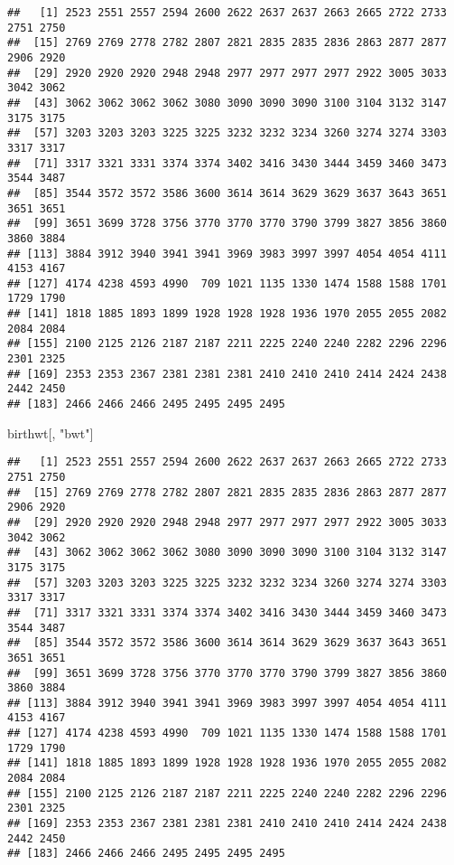 \documentclass[]{book}
\newenvironment{Shaded}{\begin{snugshade}}{\end{snugshade}}
\newcommand{\NormalTok}[1]{#1}
\newcommand{\OperatorTok}[1]{\textcolor[rgb]{0.81,0.36,0.00}{\textbf{#1}}}
\newcommand{\StringTok}[1]{\textcolor[rgb]{0.31,0.60,0.02}{#1}}
\begin{document}
\begin{Shaded}
\end{Shaded}

\begin{verbatim}
##   [1] 2523 2551 2557 2594 2600 2622 2637 2637 2663 2665 2722 2733 2751 2750
##  [15] 2769 2769 2778 2782 2807 2821 2835 2835 2836 2863 2877 2877 2906 2920
##  [29] 2920 2920 2920 2948 2948 2977 2977 2977 2977 2922 3005 3033 3042 3062
##  [43] 3062 3062 3062 3062 3080 3090 3090 3090 3100 3104 3132 3147 3175 3175
##  [57] 3203 3203 3203 3225 3225 3232 3232 3234 3260 3274 3274 3303 3317 3317
##  [71] 3317 3321 3331 3374 3374 3402 3416 3430 3444 3459 3460 3473 3544 3487
##  [85] 3544 3572 3572 3586 3600 3614 3614 3629 3629 3637 3643 3651 3651 3651
##  [99] 3651 3699 3728 3756 3770 3770 3770 3790 3799 3827 3856 3860 3860 3884
## [113] 3884 3912 3940 3941 3941 3969 3983 3997 3997 4054 4054 4111 4153 4167
## [127] 4174 4238 4593 4990  709 1021 1135 1330 1474 1588 1588 1701 1729 1790
## [141] 1818 1885 1893 1899 1928 1928 1928 1936 1970 2055 2055 2082 2084 2084
## [155] 2100 2125 2126 2187 2187 2211 2225 2240 2240 2282 2296 2296 2301 2325
## [169] 2353 2353 2367 2381 2381 2381 2410 2410 2410 2414 2424 2438 2442 2450
## [183] 2466 2466 2466 2495 2495 2495 2495
\end{verbatim}

\begin{Shaded}
\begin{Highlighting}[]
\NormalTok{birthwt[, }\StringTok{"bwt"}\NormalTok{]}
\end{Highlighting}
\end{Shaded}

\begin{verbatim}
##   [1] 2523 2551 2557 2594 2600 2622 2637 2637 2663 2665 2722 2733 2751 2750
##  [15] 2769 2769 2778 2782 2807 2821 2835 2835 2836 2863 2877 2877 2906 2920
##  [29] 2920 2920 2920 2948 2948 2977 2977 2977 2977 2922 3005 3033 3042 3062
##  [43] 3062 3062 3062 3062 3080 3090 3090 3090 3100 3104 3132 3147 3175 3175
##  [57] 3203 3203 3203 3225 3225 3232 3232 3234 3260 3274 3274 3303 3317 3317
##  [71] 3317 3321 3331 3374 3374 3402 3416 3430 3444 3459 3460 3473 3544 3487
##  [85] 3544 3572 3572 3586 3600 3614 3614 3629 3629 3637 3643 3651 3651 3651
##  [99] 3651 3699 3728 3756 3770 3770 3770 3790 3799 3827 3856 3860 3860 3884
## [113] 3884 3912 3940 3941 3941 3969 3983 3997 3997 4054 4054 4111 4153 4167
## [127] 4174 4238 4593 4990  709 1021 1135 1330 1474 1588 1588 1701 1729 1790
## [141] 1818 1885 1893 1899 1928 1928 1928 1936 1970 2055 2055 2082 2084 2084
## [155] 2100 2125 2126 2187 2187 2211 2225 2240 2240 2282 2296 2296 2301 2325
## [169] 2353 2353 2367 2381 2381 2381 2410 2410 2410 2414 2424 2438 2442 2450
## [183] 2466 2466 2466 2495 2495 2495 2495
\end{verbatim}
\end{document}
